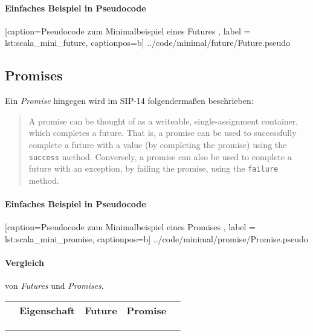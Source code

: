 

\paragraph{Einfaches Beispiel in Pseudocode}


    [caption={Pseudocode zum Minimalbeispiel eines Futures },
       label = lst:scala_mini_future,
       captionpos=b]
 {../code/minimal/future/Future.pseudo}

\subsection{Promises}

Ein \emph{Promise} hingegen wird im SIP-14 folgendermaßen beschrieben:
\begin{quote}
A promise can be thought of as a writeable, single-assignment container, which 
completes a future. That is, a promise can be used to successfully complete a 
future with a value (by \glqq completing\grqq{} the promise) using the \texttt{success} method. 
Conversely, a promise can also be used to complete a future with an exception, 
by failing the promise, using the \texttt{failure} method.
\end{quote}


\paragraph{Einfaches Beispiel in Pseudocode}


    [caption={Pseudocode zum Minimalbeispiel eines Promises },
       label = lst:scala_mini_promise,
       captionpos=b]
 {../code/minimal/promise/Promise.pseudo}

\paragraph{Vergleich} von \emph{Futures} und \emph{Promises}.

\begin{table}[h]
\begin{tabular}{lllll}
 & \textbf{Eigenschaft} & \textbf{Future} & \textbf{Promise} &  \\
 &  &  &  &  \\
 &  &  &  &  \\
 &  &  &  & 
\end{tabular}
\end{table}
